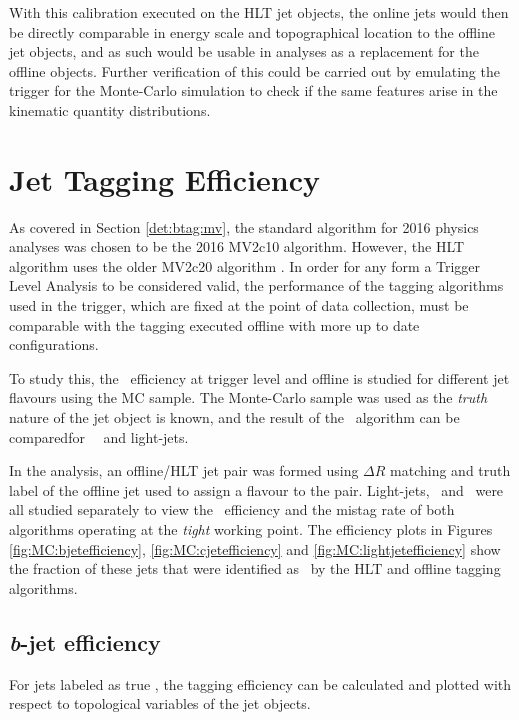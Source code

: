 		With this calibration executed on the HLT jet objects, the online jets would then be directly comparable in energy scale and topographical location to the offline jet objects, and as such would be usable in analyses as a replacement for the offline objects. Further verification of this could be carried out by emulating the trigger for the Monte-Carlo simulation to check if the same features arise in the kinematic quantity distributions.

\section{Jet Tagging Efficiency}

	As covered in Section  \ref{det:btag:mv}, the standard algorithm for 2016 physics analyses was chosen to be the 2016 MV2c10 algorithm. However, the HLT \btag\, algorithm uses the older MV2c20 algorithm \cite{trig2015}. In order for any form a Trigger Level Analysis to be considered valid, the performance of the tagging algorithms used in the trigger, which are fixed at the point of data collection, must be comparable with the tagging executed offline with more up to date \btag\, configurations.

	To study this, the \btag\, efficiency at trigger level and offline is studied for different jet flavours using the MC sample. The Monte-Carlo sample was used as the \textit{truth} nature of the jet object is known, and the result of the \btag\, algorithm can be comparedfor \bjets\, \cjets\, and light-jets.

	In the analysis, an offline/HLT jet pair was formed using $\Delta R$ matching and truth label of the offline jet used to assign a flavour to the pair. Light-jets, \bjets\, and \cjets\, were all studied separately to view the \btag\, efficiency and the mistag rate of both algorithms operating at the \textit{tight} working point. The efficiency plots in Figures \ref{fig:MC:bjetefficiency}, \ref{fig:MC:cjetefficiency} and \ref{fig:MC:lightjetefficiency} show the fraction of these jets that were identified as \bjets\, by the HLT and offline tagging algorithms.

	\subsection{\textit{b}-jet efficiency}

	For jets labeled as true \bjets, the tagging efficiency can be calculated and plotted with respect to topological variables of the jet objects.

